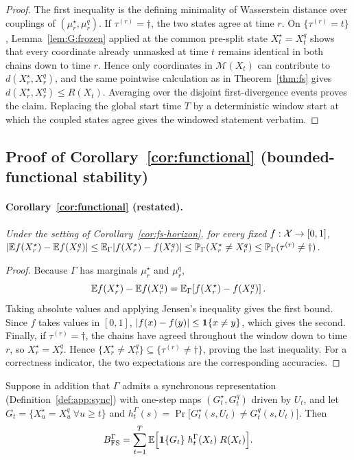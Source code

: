 \begin{proof}
The first inequality is the defining minimality of Wasserstein distance over couplings of
$(\mu_r^\star,\mu_r^q)$. If $\tau^{(r)}=\dagger$, the two states agree at time $r$. On
$\{\tau^{(r)}=t\}$, Lemma~\ref{lem:G:frozen} applied at the common pre-split state
$X_t^\star=X_t^q$ shows that every coordinate already unmasked at time $t$ remains identical in
both chains down to time $r$. Hence only coordinates in $\mathcal M(X_t)$ can contribute to
$d(X_r^\star,X_r^q)$, and the same pointwise calculation as in Theorem~\ref{thm:fs} gives
$d(X_r^\star,X_r^q)\le R(X_t)$. Averaging over the disjoint first-divergence events proves the
claim. Replacing the global start time $T$ by a deterministic window start at which the coupled
states agree gives the windowed statement verbatim.
\end{proof}



\subsection{Proof of Corollary~\ref{cor:functional} (bounded-functional stability)}
\label{app:proofs:functional}

\paragraph{Corollary~\ref{cor:functional} (restated).}
\emph{Under the setting of Corollary~\ref{cor:fs-horizon}, for every fixed
$f:\mathcal{X}\to[0,1]$,
$|\mathbb{E} f(X_r^\star)-\mathbb{E} f(X_r^q)|
\le\mathbb{E}_\Gamma|f(X_r^\star)-f(X_r^q)|
\le\mathbb{P}_\Gamma(X_r^\star\ne X_r^q)
\le\mathbb{P}_\Gamma(\tau^{(r)}\ne\dagger)$.}

\begin{proof}
Because $\Gamma$ has marginals $\mu_r^\star$ and $\mu_r^q$,
\[
\mathbb{E} f(X_r^\star)-\mathbb{E} f(X_r^q)
=\mathbb{E}_\Gamma\!\left[f(X_r^\star)-f(X_r^q)\right].
\]
Taking absolute values and applying Jensen's inequality gives the first bound. Since $f$ takes
values in $[0,1]$, $|f(x)-f(y)|\le\mathbf{1}\{x\ne y\}$, which gives the second. Finally, if
$\tau^{(r)}=\dagger$, the chains have agreed throughout the window down to time $r$, so
$X_r^\star=X_r^q$. Hence
$\{X_r^\star\ne X_r^q\}\subseteq\{\tau^{(r)}\ne\dagger\}$, proving the last inequality.
For a correctness indicator, the two expectations are the corresponding accuracies.
\end{proof}

\label{app:proofs:hazard}
\begin{proposition}
\label{prop:G:hazard}
Suppose in addition that $\Gamma$ admits a synchronous representation
(Definition~\ref{def:app:sync}) with one-step maps $(G^{\star}_{t},G^{q}_{t})$ driven by
$U_{t}$, and let $G_{t}=\{X^{\star}_{u}=X^{q}_{u}\ \forall u\ge t\}$ and
$h^{\Gamma}_{t}(s)=\Pr\big[G^{\star}_{t}(s,U_{t})\neq G^{q}_{t}(s,U_{t})\big]$. Then
\[
B_{\mathrm{FS}}^{\Gamma}=\sum_{t=1}^{T}\mathbb{E}\Big[\mathbf{1}\{G_{t}\}\;h^{\Gamma}_{t}(X_{t})\;R(X_{t})\Big].
\]
\end{proposition}


